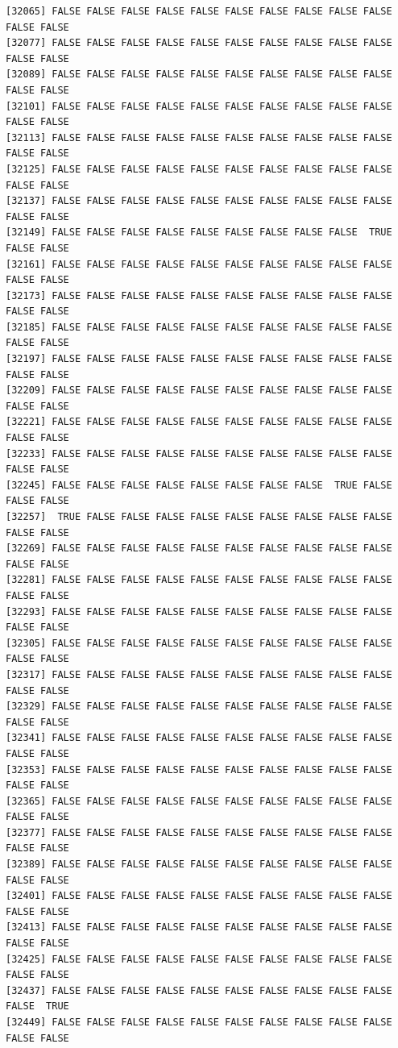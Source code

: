 \documentclass[
  a4paper,
  DIV=11,
  numbers=noendperiod]{scrartcl}
\begin{document}
\begin{verbatim}
[32065] FALSE FALSE FALSE FALSE FALSE FALSE FALSE FALSE FALSE FALSE FALSE FALSE
[32077] FALSE FALSE FALSE FALSE FALSE FALSE FALSE FALSE FALSE FALSE FALSE FALSE
[32089] FALSE FALSE FALSE FALSE FALSE FALSE FALSE FALSE FALSE FALSE FALSE FALSE
[32101] FALSE FALSE FALSE FALSE FALSE FALSE FALSE FALSE FALSE FALSE FALSE FALSE
[32113] FALSE FALSE FALSE FALSE FALSE FALSE FALSE FALSE FALSE FALSE FALSE FALSE
[32125] FALSE FALSE FALSE FALSE FALSE FALSE FALSE FALSE FALSE FALSE FALSE FALSE
[32137] FALSE FALSE FALSE FALSE FALSE FALSE FALSE FALSE FALSE FALSE FALSE FALSE
[32149] FALSE FALSE FALSE FALSE FALSE FALSE FALSE FALSE FALSE  TRUE FALSE FALSE
[32161] FALSE FALSE FALSE FALSE FALSE FALSE FALSE FALSE FALSE FALSE FALSE FALSE
[32173] FALSE FALSE FALSE FALSE FALSE FALSE FALSE FALSE FALSE FALSE FALSE FALSE
[32185] FALSE FALSE FALSE FALSE FALSE FALSE FALSE FALSE FALSE FALSE FALSE FALSE
[32197] FALSE FALSE FALSE FALSE FALSE FALSE FALSE FALSE FALSE FALSE FALSE FALSE
[32209] FALSE FALSE FALSE FALSE FALSE FALSE FALSE FALSE FALSE FALSE FALSE FALSE
[32221] FALSE FALSE FALSE FALSE FALSE FALSE FALSE FALSE FALSE FALSE FALSE FALSE
[32233] FALSE FALSE FALSE FALSE FALSE FALSE FALSE FALSE FALSE FALSE FALSE FALSE
[32245] FALSE FALSE FALSE FALSE FALSE FALSE FALSE FALSE  TRUE FALSE FALSE FALSE
[32257]  TRUE FALSE FALSE FALSE FALSE FALSE FALSE FALSE FALSE FALSE FALSE FALSE
[32269] FALSE FALSE FALSE FALSE FALSE FALSE FALSE FALSE FALSE FALSE FALSE FALSE
[32281] FALSE FALSE FALSE FALSE FALSE FALSE FALSE FALSE FALSE FALSE FALSE FALSE
[32293] FALSE FALSE FALSE FALSE FALSE FALSE FALSE FALSE FALSE FALSE FALSE FALSE
[32305] FALSE FALSE FALSE FALSE FALSE FALSE FALSE FALSE FALSE FALSE FALSE FALSE
[32317] FALSE FALSE FALSE FALSE FALSE FALSE FALSE FALSE FALSE FALSE FALSE FALSE
[32329] FALSE FALSE FALSE FALSE FALSE FALSE FALSE FALSE FALSE FALSE FALSE FALSE
[32341] FALSE FALSE FALSE FALSE FALSE FALSE FALSE FALSE FALSE FALSE FALSE FALSE
[32353] FALSE FALSE FALSE FALSE FALSE FALSE FALSE FALSE FALSE FALSE FALSE FALSE
[32365] FALSE FALSE FALSE FALSE FALSE FALSE FALSE FALSE FALSE FALSE FALSE FALSE
[32377] FALSE FALSE FALSE FALSE FALSE FALSE FALSE FALSE FALSE FALSE FALSE FALSE
[32389] FALSE FALSE FALSE FALSE FALSE FALSE FALSE FALSE FALSE FALSE FALSE FALSE
[32401] FALSE FALSE FALSE FALSE FALSE FALSE FALSE FALSE FALSE FALSE FALSE FALSE
[32413] FALSE FALSE FALSE FALSE FALSE FALSE FALSE FALSE FALSE FALSE FALSE FALSE
[32425] FALSE FALSE FALSE FALSE FALSE FALSE FALSE FALSE FALSE FALSE FALSE FALSE
[32437] FALSE FALSE FALSE FALSE FALSE FALSE FALSE FALSE FALSE FALSE FALSE  TRUE
[32449] FALSE FALSE FALSE FALSE FALSE FALSE FALSE FALSE FALSE FALSE FALSE FALSE

\end{verbatim}
\end{document}
